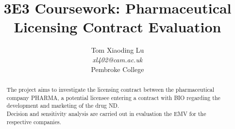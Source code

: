 \documentclass[journal]{IEEEtran}
\begin{document}
\title{3E3 Coursework: Pharmaceutical Licensing Contract Evaluation}

\author{Tom Xiaoding Lu\\
				\textit{xl402@cam.ac.uk}\\
				Pembroke College\\%
} %
\maketitle

\begin{abstract}
The project aims to investigate the licensing contract between the pharmaceutical company PHARMA, a potential licensee entering a contract with BIO regarding the development and marketing of the drug ND.\\ Decision and sensitivity analysis are carried out in evaluation the EMV for the respective companies.
\end{abstract}

\mbox{}
\printnomenclature
\end{document}
